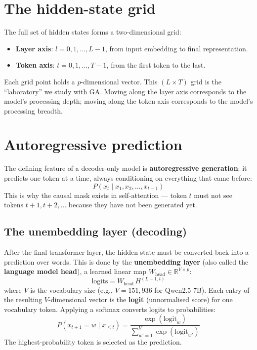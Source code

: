 \documentclass[11pt, twoside, openright]{memoir}
\numberwithin{equation}{chapter}
\begin{document}
\section{The hidden-state grid}

The full set of hidden states forms a two-dimensional grid:
\begin{itemize}[nosep]
\item \textbf{Layer axis}: $l = 0, 1, \ldots, L-1$, from input
  embedding to final representation.
\item \textbf{Token axis}: $t = 0, 1, \ldots, T-1$, from the first
  token to the last.
\end{itemize}
Each grid point holds a $p$-dimensional vector.  This $(L \times T)$
grid is the ``laboratory'' we study with GA.  Moving along the layer
axis corresponds to the model's processing depth; moving along the
token axis corresponds to the model's processing breadth.

\section{Autoregressive prediction}

The defining feature of a decoder-only model is \textbf{autoregressive
generation}: it predicts one token at a time, always conditioning on
everything that came before:
\begin{equation}
  P(x_t \mid x_1, x_2, \ldots, x_{t-1})
\end{equation}
This is why the causal mask exists in self-attention --- token $t$ must
not see tokens $t+1, t+2, \ldots$ because they have not been generated
yet.

\subsection*{The unembedding layer (decoding)}

After the final transformer layer, the hidden state must be converted
back into a prediction over words.  This is done by the
\textbf{unembedding layer} (also called the \textbf{language model
head}), a learned linear map
$W_{\mathrm{head}} \in \mathbb{R}^{V \times p}$:
\begin{equation}
  \mathrm{logits} = W_{\mathrm{head}} \, H^{(L-1, t)}
\end{equation}
where $V$ is the vocabulary size (e.g., $V = 151{,}936$ for
Qwen2.5-7B).  Each entry of the resulting $V$-dimensional vector is
the \textbf{logit} (unnormalised score) for one vocabulary token.
Applying a softmax converts logits to probabilities:
\begin{equation}
  P(x_{t+1} = w \mid x_{\le t})
    = \frac{\exp(\mathrm{logit}_w)}
           {\sum_{w'=1}^{V} \exp(\mathrm{logit}_{w'})}
\end{equation}
The highest-probability token is selected as the prediction.
\end{document}
